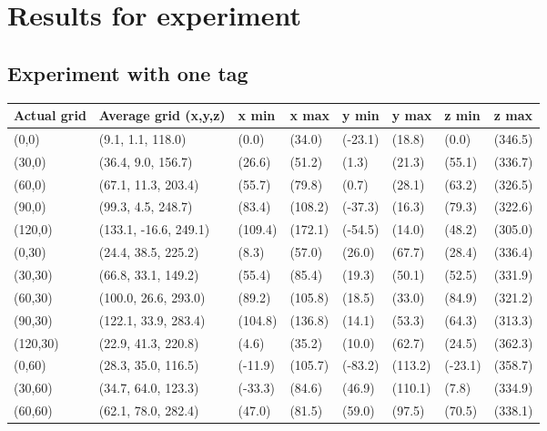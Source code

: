 \section{Results for experiment}
\label{app:experiment}

\subsection{Experiment with one tag}
\label{app:one-tag}
\begin{table}[H]
    \begin{tabular}{|l|l|l|l|l|l|l|l|}
    \hline
    Actual grid & Average grid (x,y,z)  & x min   & x max   & y min    & y max   & z min   & z max    \\ \hline
    (0,0) 	& (9.1, 1.1, 118.0) 	 & (0.0) 	& (34.0)	& (-23.1)	 & (18.8) 	 & (0.0)	 & (346.5)	\\ \hline
    (30,0) 	& (36.4, 9.0, 156.7) 	 & (26.6) 	& (51.2)	& (1.3)	 & (21.3) 	 & (55.1)	 & (336.7)	\\ \hline
    (60,0) 	& (67.1, 11.3, 203.4) 	 & (55.7) 	& (79.8)	& (0.7)	 & (28.1) 	 & (63.2)	 & (326.5)	\\ \hline
    (90,0) 	& (99.3, 4.5, 248.7) 	 & (83.4) 	& (108.2)	& (-37.3)	 & (16.3) 	 & (79.3)	 & (322.6)	\\ \hline
    (120,0) 	& (133.1, -16.6, 249.1) 	 & (109.4) 	& (172.1)	& (-54.5)	 & (14.0) 	 & (48.2)	 & (305.0)	\\ \hline
    (0,30) 	& (24.4, 38.5, 225.2) 	 & (8.3) 	& (57.0)	& (26.0)	 & (67.7) 	 & (28.4)	 & (336.4)	\\ \hline
    (30,30) 	& (66.8, 33.1, 149.2) 	 & (55.4) 	& (85.4)	& (19.3)	 & (50.1) 	 & (52.5)	 & (331.9)	\\ \hline
    (60,30) 	& (100.0, 26.6, 293.0) 	 & (89.2) 	& (105.8)	& (18.5)	 & (33.0) 	 & (84.9)	 & (321.2)	\\ \hline
    (90,30) 	& (122.1, 33.9, 283.4) 	 & (104.8) 	& (136.8)	& (14.1)	 & (53.3) 	 & (64.3)	 & (313.3)	\\ \hline
    (120,30) 	& (22.9, 41.3, 220.8) 	 & (4.6) 	& (35.2)	& (10.0)	 & (62.7) 	 & (24.5)	 & (362.3)	\\ \hline
    (0,60) 	& (28.3, 35.0, 116.5) 	 & (-11.9) 	& (105.7)	& (-83.2)	 & (113.2) 	 & (-23.1)	 & (358.7)	\\ \hline
    (30,60)  	& (34.7, 64.0, 123.3) 	 & (-33.3) 	& (84.6)	& (46.9)	 & (110.1) 	 & (7.8)	 & (334.9)	\\ \hline
    (60,60)  	& (62.1, 78.0, 282.4) 	 & (47.0) 	& (81.5)	& (59.0)	 & (97.5) 	 & (70.5)	 & (338.1)	\\ \hline

\end{tabular}
\end{table}
